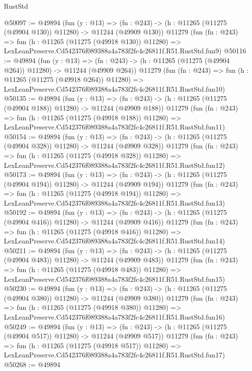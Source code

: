 \begin{lexlean}{RustStd}
\begin{coremodule}
@50097 := @49894
    (fun (y : @13) =>
    (fn : @243) -> (h : @11265 (@11275 (@49904 @130)) @11280) -> @11244 (@49909 @130))
    @11279
    (fun (fn : @243) =>
    fun (h : @11265 (@11275 (@49918 @130)) @11280) =>
    LexLeanPreserve.Cd542376f089388a4a783f2fc4c26811f.R51.RustStd.fun9)
@50116 := @49894
    (fun (y : @13) =>
    (fn : @243) -> (h : @11265 (@11275 (@49904 @264)) @11280) -> @11244 (@49909 @264))
    @11279
    (fun (fn : @243) =>
    fun (h : @11265 (@11275 (@49918 @264)) @11280) =>
    LexLeanPreserve.Cd542376f089388a4a783f2fc4c26811f.R51.RustStd.fun10)
@50135 := @49894
    (fun (y : @13) =>
    (fn : @243) -> (h : @11265 (@11275 (@49904 @188)) @11280) -> @11244 (@49909 @188))
    @11279
    (fun (fn : @243) =>
    fun (h : @11265 (@11275 (@49918 @188)) @11280) =>
    LexLeanPreserve.Cd542376f089388a4a783f2fc4c26811f.R51.RustStd.fun11)
@50154 := @49894
    (fun (y : @13) =>
    (fn : @243) -> (h : @11265 (@11275 (@49904 @328)) @11280) -> @11244 (@49909 @328))
    @11279
    (fun (fn : @243) =>
    fun (h : @11265 (@11275 (@49918 @328)) @11280) =>
    LexLeanPreserve.Cd542376f089388a4a783f2fc4c26811f.R51.RustStd.fun12)
@50173 := @49894
    (fun (y : @13) =>
    (fn : @243) -> (h : @11265 (@11275 (@49904 @194)) @11280) -> @11244 (@49909 @194))
    @11279
    (fun (fn : @243) =>
    fun (h : @11265 (@11275 (@49918 @194)) @11280) =>
    LexLeanPreserve.Cd542376f089388a4a783f2fc4c26811f.R51.RustStd.fun13)
@50192 := @49894
    (fun (y : @13) =>
    (fn : @243) -> (h : @11265 (@11275 (@49904 @416)) @11280) -> @11244 (@49909 @416))
    @11279
    (fun (fn : @243) =>
    fun (h : @11265 (@11275 (@49918 @416)) @11280) =>
    LexLeanPreserve.Cd542376f089388a4a783f2fc4c26811f.R51.RustStd.fun14)
@50211 := @49894
    (fun (y : @13) =>
    (fn : @243) -> (h : @11265 (@11275 (@49904 @483)) @11280) -> @11244 (@49909 @483))
    @11279
    (fun (fn : @243) =>
    fun (h : @11265 (@11275 (@49918 @483)) @11280) =>
    LexLeanPreserve.Cd542376f089388a4a783f2fc4c26811f.R51.RustStd.fun15)
@50230 := @49894
    (fun (y : @13) =>
    (fn : @243) -> (h : @11265 (@11275 (@49904 @380)) @11280) -> @11244 (@49909 @380))
    @11279
    (fun (fn : @243) =>
    fun (h : @11265 (@11275 (@49918 @380)) @11280) =>
    LexLeanPreserve.Cd542376f089388a4a783f2fc4c26811f.R51.RustStd.fun16)
@50249 := @49894
    (fun (y : @13) =>
    (fn : @243) -> (h : @11265 (@11275 (@49904 @517)) @11280) -> @11244 (@49909 @517))
    @11279
    (fun (fn : @243) =>
    fun (h : @11265 (@11275 (@49918 @517)) @11280) =>
    LexLeanPreserve.Cd542376f089388a4a783f2fc4c26811f.R51.RustStd.fun17)
@50268 := @49894

\end{coremodule}
\end{lexlean}
